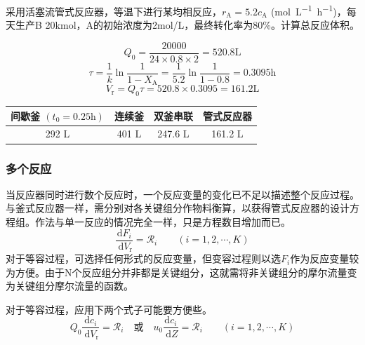 \begin{frame}
    \frametitle{}

    \begin{example}
        采用活塞流管式反应器，等温下进行某均相反应，$r_\mathrm{A}=5.2c_\mathrm{A}$ (\si{mol.L^{-1}.h^{-1}})，每天生产B 20kmol，A的初始浓度为2mol/L，最终转化率为80\%。计算总反应体积。
    \end{example}
    \pause
    \[
        Q_0 = \frac{20000}{24\times 0.8 \times 2} = 520.8 \mathrm{L}
    \]
    \[
        \tau =\frac{1}{k}\ln \frac{1}{1-X_{\mathrm{A}}}=\frac{1}{5.2}\ln \frac{1}{1-0.8}=0.3095 \mathrm{h}
    \]
    \[
        V_{\mathrm{r}}=Q_{0}\tau = 520.8 \times 0.3095 = 161.2 \mathrm{L}
    \]
    \pause 
    \vspace{-1em}
    \begin{table}
        \begin{tabular}{|c|c|c|c|}
            \hline
            间歇釜 $(t_0=0.25\mathrm{h})$ & 连续釜 & 双釜串联 & 管式反应器\\
            \hline
            292 L & 401 L & 247.6 L & 161.2 L\\
            \hline
        \end{tabular}
    \end{table}

\end{frame}

\begin{frame}
    \frametitle{多个反应}

    当反应器同时进行数个反应时，一个反应变量的变化已不足以描述整个反应过程。与釜式反应器一样，需分别对各关键组分作物料衡算，以获得管式反应器的设计方程组。作法与单一反应的情况完全一样，只是方程数目增加而已。
    \[
        \frac{\mathrm{d} F_{i}}{\mathrm{~d} V_{\mathrm{r}}}=\mathscr{R}_{i} \qquad(i=1,2, \cdots, K)
    \]
    对于等容过程，可选择任何形式的反应变量，但变容过程则以选$F_{i}$作为反应变量较为方便。由于N个反应组分并非都是关键组分，这就需将非关键组分的摩尔流量变为关键组分摩尔流量的函数。

    对于等容过程，应用下两个式子可能要方便些。
    \[
       Q_0\frac{\mathrm{d} c_{i}}{\mathrm{~d} V_{\mathrm{r}}}=\mathscr{R}_{i} \quad \text{或} \quad u_0\frac{\mathrm{d} c_{i}}{\mathrm{~d} Z}=\mathscr{R}_{i} \qquad(i=1,2, \cdots, K)
    \]

\end{frame}


